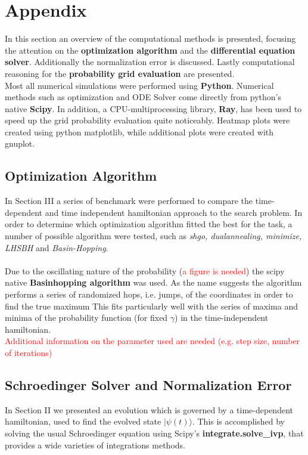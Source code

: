 \documentclass[aps,pra,reprint, onecolumn]{revtex4-2}
\newcommand{\red}[1]{\textcolor{red}{#1}}
\begin{document}
\section{Appendix}
In this section an overview of the computational methods is presented, focusing the attention on the \textbf{optimization algorithm} and the \textbf{differential equation solver}. Additionally the normalization error is discussed. Lastly computational reasoning for the \textbf{probability grid evaluation} are presented. \\

Most all numerical simulations were performed using \textbf{Python}. Numerical methods such as optimization and ODE Solver come directly from python's native \textbf{Scipy}. In addition, a CPU-multiprocessing library, \textbf{Ray}, has been used to speed up the grid probability evaluation quite noticeably. Heatmap plots were created using python matplotlib, while additional plots were created with gnuplot.

\subsection{Optimization Algorithm}
In Section III a series of benchmark were performed to compare the time-dependent and time independent hamiltonian approach to the search problem. In order to determine which optimization algorithm fitted the best for the task, a number of possible algorithm were tested, such as \textit{shgo, dualannealing, minimize, LHSBH} and \textit{Basin-Hopping}.\\ \\
Due to the oscillating nature of the probability (\red{a figure is needed}) the scipy native \textbf{Basinhopping algorithm} was used. As the name suggests the algorithm performs a series of randomized hops, i.e. jumps, of the coordinates in order to find the true maximum This fits particularly well with the series of maxima and minima of the probability function (for fixed $\gamma$) in the time-independent hamiltonian. \\\red{Additional information on the parameter used are needed (e.g. step size, number of iterations)}

\subsection{Schroedinger Solver and Normalization Error}
In Section II we presented an evolution which is governed by a time-dependent hamiltonian, used to find the evolved state $|\psi(t)\rangle$. This is accomplished by solving the usual Schroedinger equation using Scipy's \textbf{integrate.solve\_ivp}, that provides a wide varieties of integrations methods. \\
\end{document}
